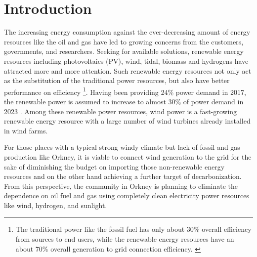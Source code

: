 \documentclass[12pt,a4paper]{report}
\begin{document}
    \chapter{Introduction}
        The increasing energy consumption against the ever-decreasing amount of
        energy resources like the oil and gas have led to
        growing concerns from the customers, governments, and researchers.
        Seeking for available solutions, renewable energy resources including
        photovoltaics (PV), wind, tidal, biomass and hydrogens have attracted
        more and more attention. Such renewable energy resources not only act as the substitution of the traditional power resources,
        but also have better performance on efficiency \footnote{The traditional power like the fossil fuel has only about 30\% overall efficiency from sources to end users, while the renewable energy resources have an about 70\% overall generation to grid connection efficiency. \cite{paper:renewableefficiency}}. 
        Having been providing 24\% power demand in 2017, the renewable power is assumed to increase to almost 30\% of power demand in 2023 \cite{website:iea}.
        Among these renewable power resources, wind power is a fast-growing
        renewable energy resource with a large number of wind turbines already
        installed in wind farms. 
        
        For those places with a typical strong windy climate but lack of fossil and gas production
        like Orkney, it is viable to connect wind generation to the grid for the sake of diminishing the budget on importing those non-renewable 
        energy resources and on the other hand achieving a further target of decarbonization. From this
        perspective, the community in Orkney is planning to eliminate the dependence on
        oil fuel and gas using completely clean electricity power resources like wind, hydrogen, and sunlight. 
        
\end{document}
